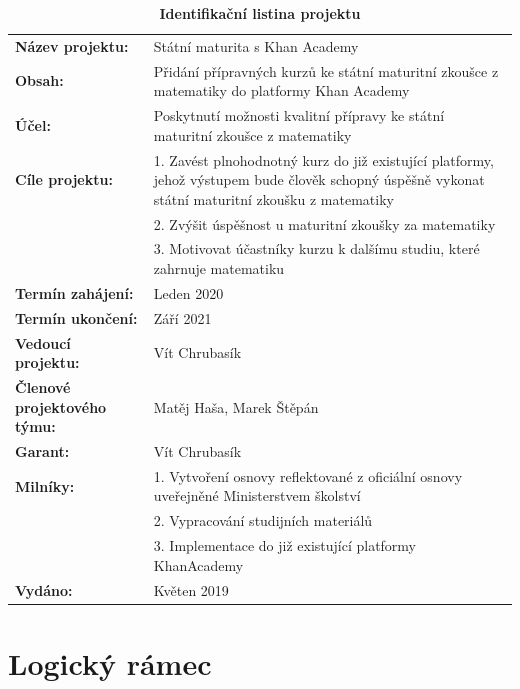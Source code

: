 \documentclass[12pt, a4paper]{report}
\begin{document}
\begin{table}[htbp]
\caption{\textbf{Identifikační listina projektu}}
\centering
\footnotesize
\begin{tabularx}{\textwidth}{lX}
\textbf{Název projektu:} & Státní maturita s Khan Academy\\
\textbf{Obsah:} & Přidání přípravných kurzů ke státní maturitní zkoušce z matematiky do platformy Khan Academy\\
\textbf{Účel:} & Poskytnutí možnosti kvalitní přípravy ke státní maturitní zkoušce z matematiky\\
\textbf{Cíle projektu:} & 1. Zavést plnohodnotný kurz do již existující platformy, jehož výstupem bude člověk schopný úspěšně vykonat státní maturitní zkoušku z matematiky\\
 & 2. Zvýšit úspěšnost u maturitní zkoušky za matematiky\\
 & 3. Motivovat účastníky kurzu k dalšímu studiu, které zahrnuje matematiku\\
\textbf{Termín zahájení:} & Leden 2020\\
\textbf{Termín ukončení:} & Září 2021\\
\textbf{Vedoucí projektu:} & Vít Chrubasík\\
\textbf{Členové projektového týmu:} & Matěj Haša, Marek Štěpán\\
\textbf{Garant:} & Vít Chrubasík\\
\textbf{Milníky:} & 1. Vytvoření osnovy reflektované z oficiální osnovy uveřejněné Ministerstvem školství\\
& 2. Vypracování studijních materiálů\\
& 3. Implementace do již existující platformy KhanAcademy\\
\textbf{Vydáno:} & Květen 2019\\
\end{tabularx}
\end{table}


\chapter{Logický rámec}
\label{sec:org801389c}
\end{document}
